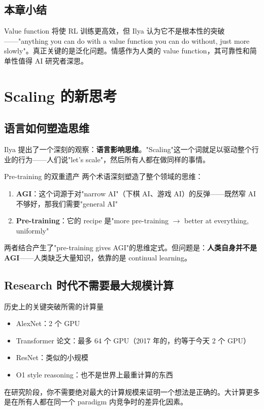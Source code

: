 \documentclass[a4paper]{article}
\begin{document}
\subsection{本章小结}

Value function 将使 RL 训练更高效，但 Ilya 认为它不是根本性的突破——"anything you can do with a value function you can do without, just more slowly"。真正关键的是泛化问题。情感作为人类的 value function，其可靠性和简单性值得 AI 研究者深思。


\section{Scaling 的新思考}

\subsection{语言如何塑造思维}

Ilya 提出了一个深刻的观察：\textbf{语言影响思维}。"Scaling"这一个词就足以驱动整个行业的行为——人们说"let's scale"，然后所有人都在做同样的事情。

\begin{importantbox}{Pre-training 的双重遗产}
两个术语深刻塑造了整个领域的思维：
\begin{enumerate}
    \item \textbf{AGI}：这个词源于对"narrow AI"（下棋 AI、游戏 AI）的反弹——既然窄 AI 不够好，那我们需要"general AI"
    \item \textbf{Pre-training}：它的 recipe 是"more pre-training $\rightarrow$ better at everything, uniformly"
\end{enumerate}
两者结合产生了"pre-training gives AGI"的思维定式。但问题是：\textbf{人类自身并不是 AGI}——人类缺乏大量知识，依靠的是 continual learning。
\end{importantbox}

\subsection{Research 时代不需要最大规模计算}

\begin{knowledgebox}{历史上的关键突破所需的计算量}
\begin{itemize}
    \item AlexNet：2 个 GPU
    \item Transformer 论文：最多 64 个 GPU（2017 年的，约等于今天 2 个 GPU）
    \item ResNet：类似的小规模
    \item O1 style reasoning：也不是世界上最重计算的东西
\end{itemize}
在研究阶段，你不需要绝对最大的计算规模来证明一个想法是正确的。大计算更多是在所有人都在同一个 paradigm 内竞争时的差异化因素。
\end{knowledgebox}
\end{document}
